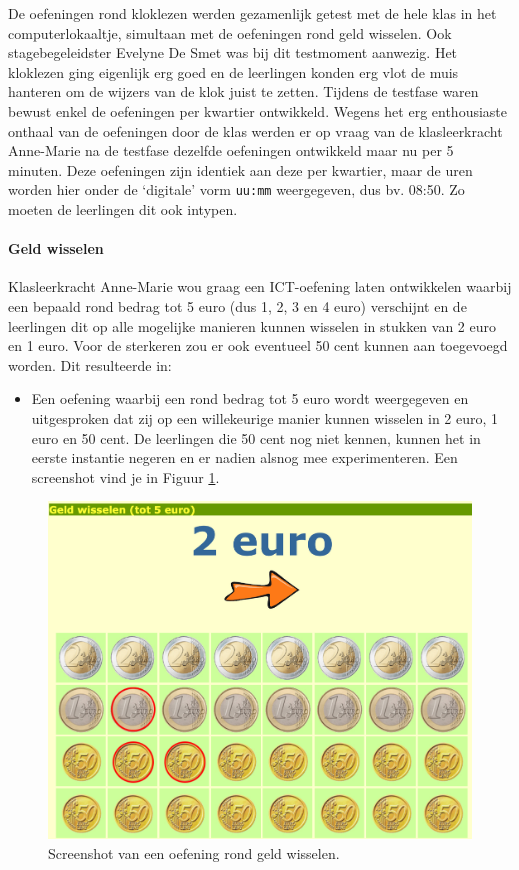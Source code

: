 \documentclass[a4paper,11pt]{article}
\theoremstyle{definition}
\begin{document}
\noindent De oefeningen rond kloklezen werden gezamenlijk getest met de hele klas in het 
computerlokaaltje, simultaan met de oefeningen rond geld wisselen. Ook stagebegeleidster Evelyne De Smet was bij dit testmoment aanwezig. 
Het kloklezen ging eigenlijk erg goed en de leerlingen konden erg vlot de muis 
hanteren om de wijzers van de klok juist te zetten. Tijdens de testfase waren 
bewust enkel de oefeningen per kwartier ontwikkeld. Wegens het erg enthousiaste 
onthaal van de oefeningen door de klas werden er op vraag van de klasleerkracht Anne-Marie na de testfase dezelfde oefeningen ontwikkeld 
maar nu per 5 minuten. Deze oefeningen zijn identiek aan deze per kwartier, maar de uren worden 
hier onder de `digitale' vorm \texttt{uu:mm} weergegeven, dus bv. 08:50. Zo 
moeten de leerlingen dit ook intypen.

\paragraph{Geld wisselen} Klasleerkracht Anne-Marie wou graag een ICT-oefening 
laten ontwikkelen waarbij een bepaald rond bedrag tot 5 euro (dus 1, 2, 3 en 4 euro) verschijnt en de leerlingen dit op alle mogelijke manieren kunnen
wisselen in stukken van 2 euro en 1 euro. Voor de sterkeren zou er ook eventueel 
50 cent kunnen aan toegevoegd worden. Dit resulteerde in:
\begin{itemize}
  \item Een oefening waarbij een rond bedrag tot 5 euro wordt weergegeven en uitgesproken
  dat zij op een willekeurige manier kunnen wisselen in 2 euro, 1 euro en 50 
  cent. De leerlingen die 50 cent nog niet kennen, kunnen het in eerste 
  instantie negeren en er nadien alsnog mee experimenteren. Een screenshot vind 
  je in Figuur \ref{geld}.
  \end{itemize}
\begin{figure}[h!]
  \centering
  \includegraphics[scale=0.15]{geld.jpg}\caption{Screenshot van een oefening rond geld wisselen.}\label{geld}
\end{figure}
\end{document}

